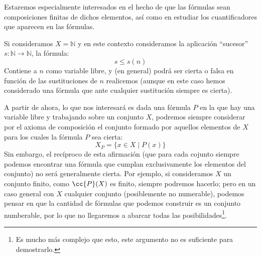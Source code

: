 Estaremos especialmente interesados en el hecho de que las fórmulas sean composiciones finitas de dichos elementos, así como en estudiar los cuantificadores que aparecen en las fórmulas.

\begin{ejemplo}
    Si consideramos $X = \mathbb{N}$ y en este contexto consideramos la aplicación ``sucesor'' $s:\mathbb{N}\to \mathbb{N}$, la fórmula:
    \begin{equation*}
        s\leq s(n)
    \end{equation*}
    Contiene a $n$ como variable libre, y (en general) podrá ser cierta o falsa en función de las sustituciones de $n$ realicemos (aunque en este caso hemos considerado una fórmula que ante cualquier sustitución siempre es cierta).
\end{ejemplo}

A partir de ahora, lo que nos interesará es dada una fórmula $P$ en la que hay una variable libre y trabajando sobre un conjunto $X$, podremos siempre considerar por el axioma de composición el conjunto formado por aquellos elementos de $X$ para los cuales la fórmula $P$ sea cierta:
\begin{equation*}
    X_P = \{x\in X \mid P(x) \}
\end{equation*}
Sin embargo, el recíproco de esta afirmación (que para cada cojunto siempre podemos encontrar una fórmula que cumplan exclusivamente los elementos del conjunto) no será generalmente cierta. Por ejemplo, si consideramos $X$ un conjunto finito, como $\cc{P}(X)$ es finito, siempre podremos hacerlo; pero en un caso general con $X$ cualquier conjunto (posiblemente no numerable), podemos pensar en que la cantidad de fórmulas que podemos construir es un conjunto numberable, por lo que no llegaremos a abarcar todas las posibilidades\footnote{Es mucho más complejo que esto, este argumento no es suficiente para demostrarlo.}.

